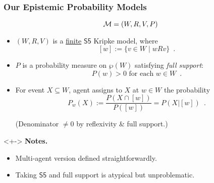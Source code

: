 \begin{frame}
  \frametitle{Our Epistemic Probability Models}
  \vspace{-1em}
  \[
  {\cal M} = (W,R,V,P)
  \]
  \vspace{-1em}
  \begin{itemize}
  \item<+-> $(W,R,V)$ is a \underline{finite} $\mathsf{S5}$ Kripke
    model, where
    \[
    [w] := \{ v\in W \mid wRv \}\enspace.
    \]

  \item<+-> $P$ is a probability measure on $\wp(W)$
    satisfying \emph{full support}:
    \[
    P(w)>0 \text{ for each } w\in W\enspace.
    \]

  \item<+-> For event $X\subseteq W$, agent assigns to $X$ at $w\in W$
    the probability
    \[
    P_w(X) :=
    \frac{P(X\cap[w])}{P([w])}
    = P(X|[w])\enspace.
    \]
    \begin{center}
      \footnotesize
      (Denominator $\neq 0$ by reflexivity \& full support.)
    \end{center}
  \end{itemize}

  \begin{uncoverenv}<+->
    \footnotesize
    \textbf{Notes.}
    \begin{itemize}
    \item Multi-agent version defined straightforwardly.

    \item Taking $\mathsf{S5}$ and full support is atypical but
      unproblematic.
    \end{itemize}
  \end{uncoverenv}
\end{frame}


